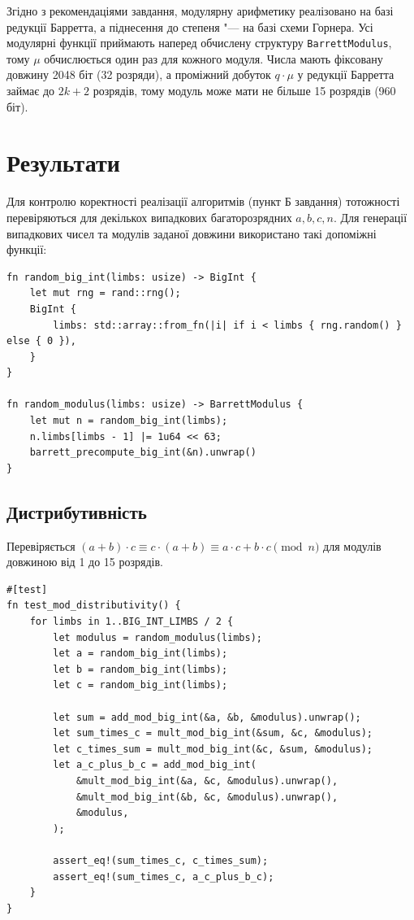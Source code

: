 \documentclass[11pt]{article}
\newcommand{\code}[1]{\texttt{#1}}
\begin{document}
Згідно з рекомендаціями завдання, модулярну арифметику реалізовано на базі
редукції Барретта, а піднесення до степеня "--- на базі схеми Горнера.
Усі модулярні функції приймають наперед обчислену структуру \code{BarrettModulus},
тому $\mu$ обчислюється один раз для кожного модуля.
Числа мають фіксовану довжину 2048 біт (32 розряди), а проміжний добуток
$q \cdot \mu$ у редукції Барретта займає до $2k + 2$ розрядів, тому модуль
може мати не більше 15 розрядів (960 біт).

\section{Результати}

Для контролю коректності реалізації алгоритмів (пункт Б завдання) тотожності
перевіряються для декількох випадкових багаторозрядних $a, b, c, n$.
Для генерації випадкових чисел та модулів заданої довжини використано такі
допоміжні функції:

\begin{lstlisting}[style=ruststyle]
fn random_big_int(limbs: usize) -> BigInt {
    let mut rng = rand::rng();
    BigInt {
        limbs: std::array::from_fn(|i| if i < limbs { rng.random() } else { 0 }),
    }
}

fn random_modulus(limbs: usize) -> BarrettModulus {
    let mut n = random_big_int(limbs);
    n.limbs[limbs - 1] |= 1u64 << 63;
    barrett_precompute_big_int(&n).unwrap()
}
\end{lstlisting}

\subsection{Дистрибутивність}

Перевіряється $(a + b) \cdot c \equiv c \cdot (a + b) \equiv a \cdot c + b \cdot c \pmod{n}$
для модулів довжиною від 1 до 15 розрядів.

\begin{lstlisting}[style=ruststyle]
#[test]
fn test_mod_distributivity() {
    for limbs in 1..BIG_INT_LIMBS / 2 {
        let modulus = random_modulus(limbs);
        let a = random_big_int(limbs);
        let b = random_big_int(limbs);
        let c = random_big_int(limbs);

        let sum = add_mod_big_int(&a, &b, &modulus).unwrap();
        let sum_times_c = mult_mod_big_int(&sum, &c, &modulus);
        let c_times_sum = mult_mod_big_int(&c, &sum, &modulus);
        let a_c_plus_b_c = add_mod_big_int(
            &mult_mod_big_int(&a, &c, &modulus).unwrap(),
            &mult_mod_big_int(&b, &c, &modulus).unwrap(),
            &modulus,
        );

        assert_eq!(sum_times_c, c_times_sum);
        assert_eq!(sum_times_c, a_c_plus_b_c);
    }
}
\end{lstlisting}
\end{document}
